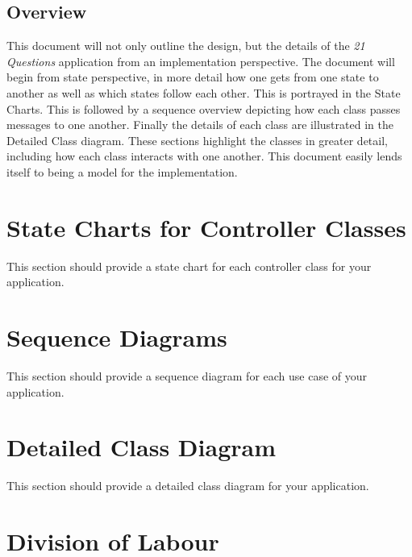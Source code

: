 \documentclass[]{article}
\begin{document}

\subsection{Overview}
\label{sub:overview}


This document will not only outline the design, but the details of the \textit{21 Questions} application from an implementation perspective. The document will begin from state perspective, in more detail how one gets from one state to another as well as which states follow each other. This is portrayed in the State Charts. This is followed by a sequence overview depicting how each class passes messages to one another. Finally the details of each class are 
illustrated in the Detailed Class diagram. These sections highlight the classes in greater detail, including how each class interacts with one another. This document easily lends itself to being a model for the implementation.



\section{State Charts for Controller Classes}
\label{sec:state_charts_for_controller_classes}
This section should provide a state chart for each controller class for your application.

\section{Sequence Diagrams}
\label{sec:sequence_diagrams}
This section should provide a sequence diagram for each use case of your application.

\section{Detailed Class Diagram}
\label{sec:detailed_class_diagram}
This section should provide a detailed class diagram for your application.

\pagebreak
\appendix
\section{Division of Labour}
\label{sec:division_of_labour}
\end{document}
